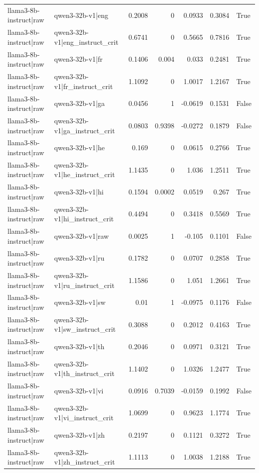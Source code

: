 \begin{table}
\begin{tabular}{l l r r r r l}
llama3-8b-instruct|raw & qwen3-32b-v1|eng & 0.2008 & 0 & 0.0933 & 0.3084 & True \\
llama3-8b-instruct|raw & qwen3-32b-v1|eng_instruct_crit & 0.6741 & 0 & 0.5665 & 0.7816 & True \\
llama3-8b-instruct|raw & qwen3-32b-v1|fr & 0.1406 & 0.004 & 0.033 & 0.2481 & True \\
llama3-8b-instruct|raw & qwen3-32b-v1|fr_instruct_crit & 1.1092 & 0 & 1.0017 & 1.2167 & True \\
llama3-8b-instruct|raw & qwen3-32b-v1|ga & 0.0456 & 1 & -0.0619 & 0.1531 & False \\
llama3-8b-instruct|raw & qwen3-32b-v1|ga_instruct_crit & 0.0803 & 0.9398 & -0.0272 & 0.1879 & False \\
llama3-8b-instruct|raw & qwen3-32b-v1|he & 0.169 & 0 & 0.0615 & 0.2766 & True \\
llama3-8b-instruct|raw & qwen3-32b-v1|he_instruct_crit & 1.1435 & 0 & 1.036 & 1.2511 & True \\
llama3-8b-instruct|raw & qwen3-32b-v1|hi & 0.1594 & 0.0002 & 0.0519 & 0.267 & True \\
llama3-8b-instruct|raw & qwen3-32b-v1|hi_instruct_crit & 0.4494 & 0 & 0.3418 & 0.5569 & True \\
llama3-8b-instruct|raw & qwen3-32b-v1|raw & 0.0025 & 1 & -0.105 & 0.1101 & False \\
llama3-8b-instruct|raw & qwen3-32b-v1|ru & 0.1782 & 0 & 0.0707 & 0.2858 & True \\
llama3-8b-instruct|raw & qwen3-32b-v1|ru_instruct_crit & 1.1586 & 0 & 1.051 & 1.2661 & True \\
llama3-8b-instruct|raw & qwen3-32b-v1|sw & 0.01 & 1 & -0.0975 & 0.1176 & False \\
llama3-8b-instruct|raw & qwen3-32b-v1|sw_instruct_crit & 0.3088 & 0 & 0.2012 & 0.4163 & True \\
llama3-8b-instruct|raw & qwen3-32b-v1|th & 0.2046 & 0 & 0.0971 & 0.3121 & True \\
llama3-8b-instruct|raw & qwen3-32b-v1|th_instruct_crit & 1.1402 & 0 & 1.0326 & 1.2477 & True \\
llama3-8b-instruct|raw & qwen3-32b-v1|vi & 0.0916 & 0.7039 & -0.0159 & 0.1992 & False \\
llama3-8b-instruct|raw & qwen3-32b-v1|vi_instruct_crit & 1.0699 & 0 & 0.9623 & 1.1774 & True \\
llama3-8b-instruct|raw & qwen3-32b-v1|zh & 0.2197 & 0 & 0.1121 & 0.3272 & True \\
llama3-8b-instruct|raw & qwen3-32b-v1|zh_instruct_crit & 1.1113 & 0 & 1.0038 & 1.2188 & True \\

\end{tabular}
\end{table}
